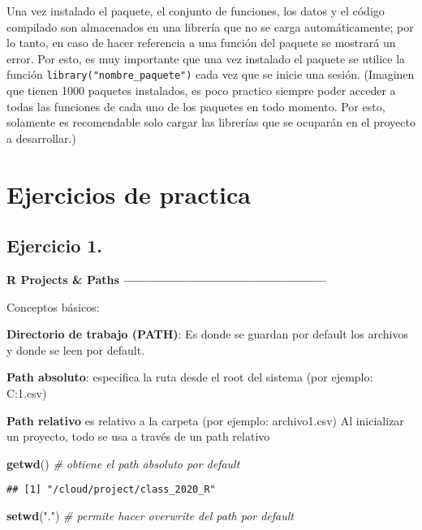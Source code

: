 \documentclass[]{book}
\newenvironment{Shaded}{\begin{snugshade}}{\end{snugshade}}
\newcommand{\CommentTok}[1]{\textcolor[rgb]{0.56,0.35,0.01}{\textit{#1}}}
\newcommand{\KeywordTok}[1]{\textcolor[rgb]{0.13,0.29,0.53}{\textbf{#1}}}
\newcommand{\NormalTok}[1]{#1}
\newcommand{\StringTok}[1]{\textcolor[rgb]{0.31,0.60,0.02}{#1}}
\begin{document}
Una vez instalado el paquete, el conjunto de funciones, los datos y el código compilado son almacenados en una librería que no se carga automáticamente; por lo tanto, en caso de hacer referencia a una función del paquete se mostrará un error. Por esto, es muy importante que una vez instalado el paquete se utilice la función \texttt{library("nombre\_paquete")} cada vez que se inicie una sesión. (Imaginen que tienen 1000 paquetes instalados, es poco practico siempre poder acceder a todas las funciones de cada uno de los paquetes en todo momento. Por esto, solamente es recomendable solo cargar las librerías que se ocuparán en el proyecto a desarrollar.)

\hypertarget{ejercicios-de-practica}{%
\section{Ejercicios de practica}\label{ejercicios-de-practica}}

\hypertarget{ejercicio-1.}{%
\subsection{Ejercicio 1.}\label{ejercicio-1.}}

\textbf{R Projects \& Paths -----------------------------------------------}

Conceptos básicos:

\textbf{Directorio de trabajo (PATH)}: Es donde se guardan por default los archivos y donde se leen por default.

\textbf{Path absoluto}: especifica la ruta desde el root del sistema (por ejemplo: C:\Users\salvador{}\archivo1.csv)

\textbf{Path relativo} es relativo a la carpeta (por ejemplo: archivo1.csv)
Al inicializar un proyecto, todo se usa a través de un path relativo

\begin{Shaded}
\begin{Highlighting}[]
\KeywordTok{getwd}\NormalTok{() }\CommentTok{# obtiene el path absoluto por default}
\end{Highlighting}
\end{Shaded}

\begin{verbatim}
## [1] "/cloud/project/class_2020_R"
\end{verbatim}

\begin{Shaded}
\begin{Highlighting}[]
\KeywordTok{setwd}\NormalTok{(}\StringTok{"."}\NormalTok{) }\CommentTok{# permite hacer overwrite del path por default}
\end{Highlighting}
\end{Shaded}
\end{document}
